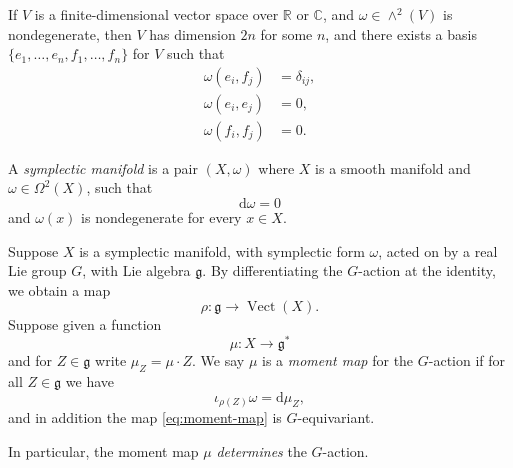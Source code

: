 \documentclass[12pt,letterpaper,reqno]{article}
\numberwithin{equation}{section}
\newcommand{\fg}{{\mathfrak g}}
\newcommand{\R}{\ensuremath{\mathbb R}}
\newcommand{\C}{\ensuremath{\mathbb C}}
\newcommand{\de}{\mathrm{d}}
\newcommand{\ti}[1]{\textit{#1}}
\DeclareMathOperator{\Vect}{Vect}
\begin{document}
\begin{prop} 
\label{prop:standard-nondegenerate-2-form}
If $V$ is a finite-dimensional vector space over $\R$ or $\C$, and
$\omega \in \wedge^2(V)$ is nondegenerate, then $V$ has 
dimension $2n$ for some $n$, and there
exists a basis $\{e_1, \dots, e_n, f_1, \dots, f_n\}$ for $V$
such that
\begin{align}
\omega(e_i, f_j) &= \delta_{ij}, \\
\omega(e_i, e_j) &= 0, \\
\omega(f_i, f_j) &= 0.
\end{align}
\end{prop}

\begin{defn}
A \ti{symplectic manifold} is a pair $(X,\omega)$
where $X$ is a smooth manifold and
$\omega \in \Omega^2(X)$, such that
\begin{equation}
  \de \omega = 0
\end{equation}
and $\omega(x)$ is nondegenerate for every $x \in X$.
\end{defn}

\begin{defn}
Suppose $X$ is a symplectic manifold, with symplectic form $\omega$,
acted on by a real Lie group $G$, with Lie algebra
$\fg$. By differentiating the $G$-action at the identity,
we obtain a map
\begin{equation}
  \rho: \fg \to \Vect(X).
\end{equation}
Suppose given a function
\begin{equation} \label{eq:moment-map}
 \mu: X \to \fg^* 
\end{equation}
and for $Z \in \fg$ write $\mu_Z = \mu \cdot Z$.
We say $\mu$ is a \ti{moment map} for the $G$-action if 
for all $Z \in \fg$ we have
\begin{equation} \label{eq:moment-map-condition-3}
  \iota_{\rho(Z)} \omega = \de \mu_Z,
\end{equation}
and in addition the map \eqref{eq:moment-map} is $G$-equivariant.
\end{defn}
In particular, the moment map $\mu$ 
\ti{determines} the $G$-action.
\end{document}

